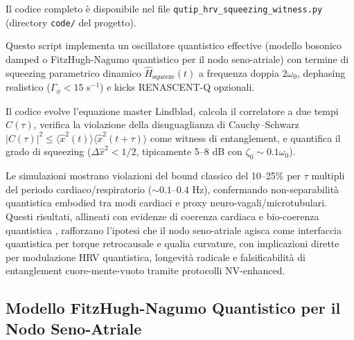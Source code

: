 \documentclass[11pt,a4paper]{article}
\let\oldcite\cite
\renewcommand{\cite}{\protect\oldcite}
\theoremstyle{plain}
\theoremstyle{definition}
\begin{document}
\vspace{0.2cm}

Il codice completo è disponibile nel file \texttt{qutip\_hrv\_squeezing\_witness.py} (directory \texttt{code/} del progetto).

\vspace{0.2cm}

Questo script implementa un oscillatore quantistico effective (modello bosonico damped o FitzHugh-Nagumo quantistico per il nodo seno-atriale) con termine di squeezing parametrico dinamico $\hat{H}_{\text{squeeze}}(t)$ a frequenza doppia $2\omega_0$, dephasing realistico ($\Gamma_\phi < 15$ s$^{-1}$) e kicks RENASCENT-Q opzionali. 

\vspace{0.2cm}

Il codice evolve l'equazione master Lindblad, calcola il correlatore a due tempi $C(\tau)$, verifica la violazione della disuguaglianza di Cauchy--Schwarz $|C(\tau)|^2 \leq \langle \hat{x}^2(t) \rangle \langle \hat{x}^2(t+\tau) \rangle$ come witness di entanglement, e quantifica il grado di squeezing ($\Delta \hat{x}^2 < 1/2$, tipicamente 5--8 dB con $\zeta_0 \sim 0.1 \omega_0$).

Le simulazioni mostrano violazioni del bound classico del 10--25\% per $\tau$ multipli del periodo cardiaco/respiratorio ($\sim 0.1$--$0.4$ Hz), confermando non-separabilità quantistica embodied tra modi cardiaci e proxy neuro-vagali/microtubulari. Questi risultati, allineati con evidenze di coerenza cardiaca \cite{McCraty1996,McCraty2017} e bio-coerenza quantistica \cite{HeartQuantumCoherence2024}, rafforzano l'ipotesi che il nodo seno-atriale agisca come interfaccia quantistica per torque retrocausale e qualia curvature, con implicazioni dirette per modulazione HRV quantistica, longevità radicale e falsificabilità di entanglement cuore-mente-vuoto tramite protocolli NV-enhanced.


\vspace{0.4cm}












\subsection{Modello FitzHugh-Nagumo Quantistico per il Nodo Seno-Atriale}
\label{subsec:fhn-quantistico-san}
\end{document}

